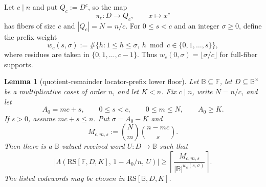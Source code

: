 \documentclass[11pt]{article}
\newtheorem{lemma}[lemma]{Lemma}
\theoremstyle{definition}
\theoremstyle{remark}
\newcommand{\F}{\mathbb{F}}
\newcommand{\B}{\mathbb{B}}
\newcommand{\RS}{\mathrm{RS}}
\newcommand{\Lst}{\Lambda}
\begin{document}
Let $c\mid n$ and put $Q_c:=D^c$, so the map
\[
        \pi_c:D\to Q_c,\qquad x\mapsto x^c
\]
has fibers of size $c$ and $|Q_c|=N=n/c$.  For $0\le s<c$ and an integer
$\sigma\ge0$, define the prefix weight
\[
        w_c(s,\sigma)
        :=\#\{h:1\le h\le\sigma,
              \ h\bmod c\in\{0,1,\ldots,s\}\},
\]
where residues are taken in $\{0,1,\ldots,c-1\}$.  Thus
$w_c(0,\sigma)=\lfloor \sigma/c\rfloor$ for full-fiber supports.

\begin{lemma}[quotient-remainder locator-prefix lower floor]
\label{lem:quotient-remainder-prefix}
Let $\B\subseteq\F$, let $D\subseteq\B^\times$ be a multiplicative coset of
order $n$, and let $K<n$.  Fix $c\mid n$, write $N=n/c$, and let
\[
        A_0=mc+s,
        \qquad 0\le s<c,
        \qquad 0\le m\le N,
        \qquad A_0\ge K .
\]
If $s>0$, assume $mc+s\le n$.  Put $\sigma=A_0-K$ and
\[
        M_{c,m,s}:=\binom Nm\binom{n-mc}{s}.
\]
Then there is a $\B$-valued received word $U:D\to\B$ such that
\[
        \bigl|\Lst(\RS[\F,D,K],\,1-A_0/n,\,U)\bigr|
        \ge
        \left\lceil \frac{M_{c,m,s}}{|\B|^{w_c(s,\sigma)}}\right\rceil .
\]
The listed codewords may be chosen in $\RS[\B,D,K]$.
\end{lemma}
\end{document}
